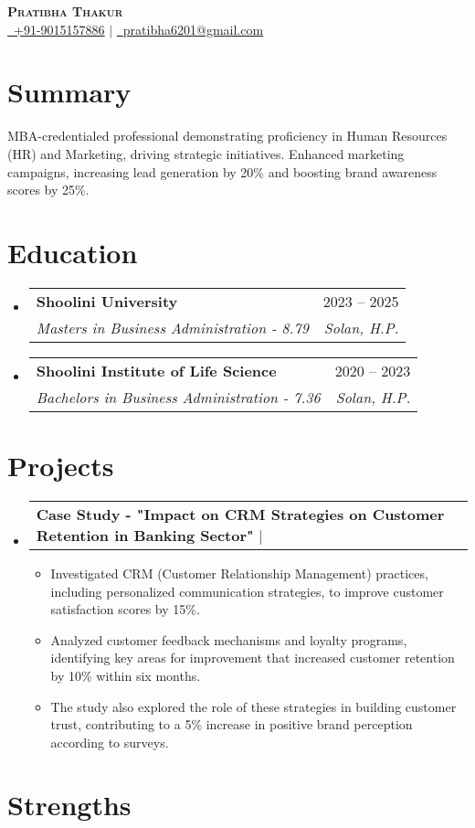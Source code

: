 \documentclass[letterpaper,10pt]{article}
\makeatletter
\newcommand{\resumeItem}[1]{\item\small{#1}}
\newcommand{\resumeSubheading}[4]{
  \item\begin{tabular*}{0.97\textwidth}{l@{\extracolsep{\fill}}r}
    \textbf{#1} & #2
    \ifstrempty{#3#4}{}{ \\ \textit{\small#3} & \textit{\small#4}}
  \end{tabular*}}
\newcommand{\resumeProjectHeading}[2]{\item\begin{tabular*}{0.97\textwidth}{l@{\extracolsep{\fill}}r}{#1} & #2 \\ \end{tabular*}}
\newcommand{\resumeSubHeadingListStart}{\begin{itemize}[leftmargin=0.15in, label={}]}
\newcommand{\resumeSubHeadingListEnd}{\end{itemize}}
\newcommand{\resumeItemListStart}{\begin{itemize}}
\newcommand{\resumeItemListEnd}{\end{itemize}}
\makeatother
\begin{document}
\begin{center}
  \textbf{\Huge \scshape Pratibha Thakur} \\ \vspace{3pt}
  \small\href{tel:+919015157886}{\ \underline{+91-9015157886}}
   $|$ \href{mailto:pratibha6201@gmail.com}{\faEnvelope\ \underline{pratibha6201@gmail.com}}
  
  
  
\end{center}\section{Summary}\begin{adjustwidth}{0.15in}{0in}\small{MBA-credentialed professional demonstrating proficiency in Human Resources (HR) and Marketing, driving strategic initiatives.  Enhanced marketing campaigns, increasing lead generation by 20\% and boosting brand awareness scores by 25\%.}\end{adjustwidth}\section{Education}\resumeSubHeadingListStart \resumeSubheading{Shoolini University}{2023 -- 2025}{Masters in Business Administration - 8.79}{Solan, H.P.}
\resumeSubheading{Shoolini Institute of Life Science}{2020 -- 2023}{Bachelors in Business Administration - 7.36}{Solan, H.P.}\resumeSubHeadingListEnd\section{Projects}\resumeSubHeadingListStart \resumeProjectHeading{\textbf{Case Study - "Impact on CRM Strategies on Customer Retention in Banking Sector"}  $|$ \emph{}}{} \resumeItemListStart \resumeItem{Investigated CRM (Customer Relationship Management) practices, including personalized communication strategies, to improve customer satisfaction scores by 15\%.}
\resumeItem{Analyzed customer feedback mechanisms and loyalty programs, identifying key areas for improvement that increased customer retention by 10\% within six months.}
\resumeItem{The study also explored the role of these strategies in building customer trust, contributing to a 5\% increase in positive brand perception according to surveys.} \resumeItemListEnd\resumeSubHeadingListEnd\section{Strengths} \resumeSubHeadingListStart\resumeSubHeadingListEnd\end{document}
\end{document}
